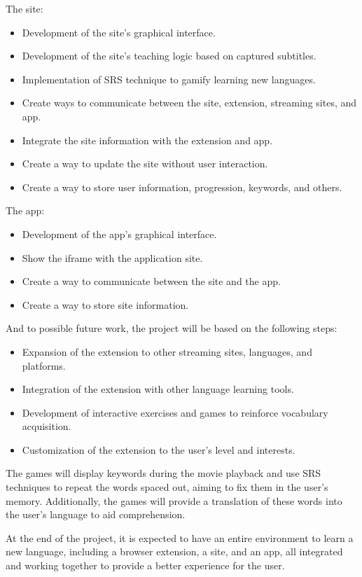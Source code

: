 \documentclass[12pt]{article}
\begin{document}
The site: 

\begin{itemize}
\item Development of the site's graphical interface.
\item Development of the site's teaching logic based on captured subtitles.
\item Implementation of SRS technique to gamify learning new languages.
\item Create ways to communicate between the site, extension, streaming sites, and app.
\item Integrate the site information with the extension and app.
\item Create a way to update the site without user interaction.
\item Create a way to store user information, progression, keywords, and others.
\end{itemize}

The app:

\begin{itemize}
\item Development of the app's graphical interface.
\item Show the iframe with the application site.
\item Create a way to communicate between the site and the app.
\item Create a way to store site information.
\end{itemize}


And to possible future work, the project will be based on the following steps:
\begin{itemize}
\item Expansion of the extension to other streaming sites, languages, and platforms.
\item Integration of the extension with other language learning tools.
\item Development of interactive exercises and games to reinforce vocabulary acquisition.
\item Customization of the extension to the user's level and interests.
\end{itemize}

The games will display keywords during the movie playback and use SRS techniques to repeat the words spaced out, aiming to fix them in the user's memory. Additionally, the games will provide a translation of these words into the user's language to aid comprehension.

At the end of the project, it is expected to have an entire environment to learn a new language, including a browser extension, a site, and an app, all integrated and working together to provide a better experience for the user.
\end{document}
